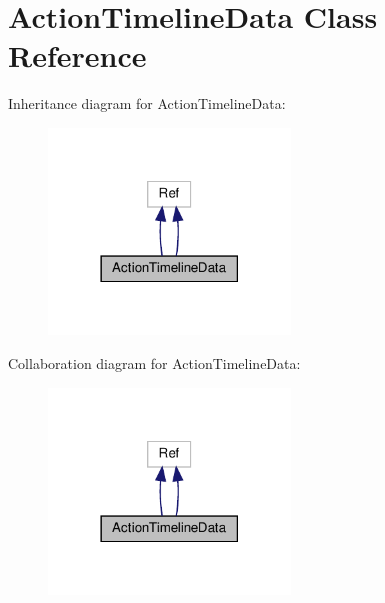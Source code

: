 \hypertarget{classActionTimelineData}{}\section{Action\+Timeline\+Data Class Reference}
\label{classActionTimelineData}


Inheritance diagram for Action\+Timeline\+Data\+:
\nopagebreak
\begin{figure}[H]
\begin{center}
\leavevmode
\includegraphics[width=182pt]{classActionTimelineData__inherit__graph}
\end{center}
\end{figure}


Collaboration diagram for Action\+Timeline\+Data\+:
\nopagebreak
\begin{figure}[H]
\begin{center}
\leavevmode
\includegraphics[width=182pt]{classActionTimelineData__coll__graph}
\end{center}
\end{figure}
